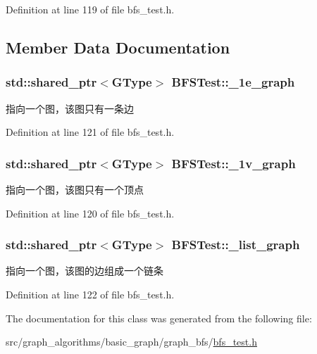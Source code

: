 Definition at line 119 of file bfs\+\_\+test.\+h.



\subsection{Member Data Documentation}
\hypertarget{class_b_f_s_test_a0158014634e67e6bee3f8f6b1e622ced}{}
\subsubsection[{\+\_\+1e\+\_\+graph}]{\setlength{\rightskip}{0pt plus 5cm}std\+::shared\+\_\+ptr$<${\bf G\+Type}$>$ B\+F\+S\+Test\+::\+\_\+1e\+\_\+graph\hspace{0.3cm}{\ttfamily [protected]}}\label{class_b_f_s_test_a0158014634e67e6bee3f8f6b1e622ced}
指向一个图，该图只有一条边 

Definition at line 121 of file bfs\+\_\+test.\+h.

\hypertarget{class_b_f_s_test_a0d7cdb7946902c8d93945a35a222b9d7}{}
\subsubsection[{\+\_\+1v\+\_\+graph}]{\setlength{\rightskip}{0pt plus 5cm}std\+::shared\+\_\+ptr$<${\bf G\+Type}$>$ B\+F\+S\+Test\+::\+\_\+1v\+\_\+graph\hspace{0.3cm}{\ttfamily [protected]}}\label{class_b_f_s_test_a0d7cdb7946902c8d93945a35a222b9d7}
指向一个图，该图只有一个顶点 

Definition at line 120 of file bfs\+\_\+test.\+h.

\hypertarget{class_b_f_s_test_aacf800be44976478c190b2acd338377f}{}
\subsubsection[{\+\_\+list\+\_\+graph}]{\setlength{\rightskip}{0pt plus 5cm}std\+::shared\+\_\+ptr$<${\bf G\+Type}$>$ B\+F\+S\+Test\+::\+\_\+list\+\_\+graph\hspace{0.3cm}{\ttfamily [protected]}}\label{class_b_f_s_test_aacf800be44976478c190b2acd338377f}
指向一个图，该图的边组成一个链条 

Definition at line 122 of file bfs\+\_\+test.\+h.



The documentation for this class was generated from the following file\+:\begin{DoxyCompactItemize}
\item 
src/graph\+\_\+algorithms/basic\+\_\+graph/graph\+\_\+bfs/\hyperlink{bfs__test_8h}{bfs\+\_\+test.\+h}\end{DoxyCompactItemize}
